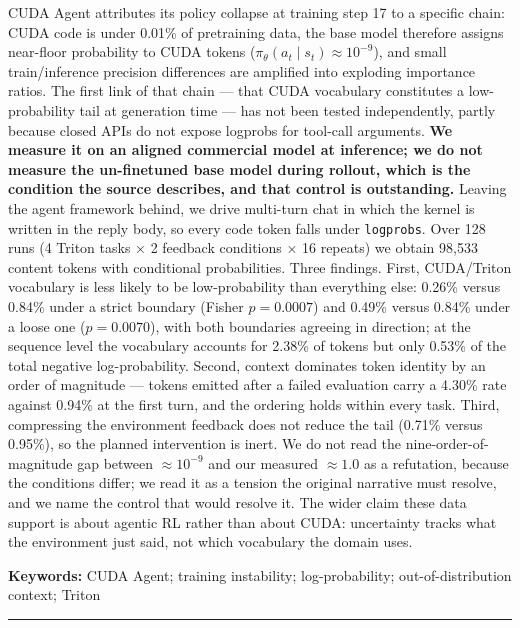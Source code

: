 \documentclass[
  11pt,
]{article}
\begin{document}
CUDA Agent attributes its policy collapse at training step 17 to a
specific chain: CUDA code is under 0.01\% of pretraining data, the base
model therefore assigns near-floor probability to CUDA tokens
(\(\pi_\theta(a_t \mid s_t) \approx 10^{-9}\)), and small
train/inference precision differences are amplified into exploding
importance ratios. The first link of that chain --- that CUDA vocabulary
constitutes a low-probability tail at generation time --- has not been
tested independently, partly because closed APIs do not expose logprobs
for tool-call arguments. \textbf{We measure it on an aligned commercial
model at inference; we do not measure the un-finetuned base model during
rollout, which is the condition the source describes, and that control
is outstanding.} Leaving the agent framework behind, we drive multi-turn
chat in which the kernel is written in the reply body, so every code
token falls under \texttt{logprobs}. Over 128 runs (4 Triton tasks × 2
feedback conditions × 16 repeats) we obtain 98,533 content tokens with
conditional probabilities. Three findings. First, CUDA/Triton vocabulary
is less likely to be low-probability than everything else: 0.26\% versus
0.84\% under a strict boundary (Fisher \(p = 0.0007\)) and 0.49\% versus
0.84\% under a loose one (\(p = 0.0070\)), with both boundaries agreeing
in direction; at the sequence level the vocabulary accounts for 2.38\%
of tokens but only 0.53\% of the total negative log-probability. Second,
context dominates token identity by an order of magnitude --- tokens
emitted after a failed evaluation carry a 4.30\% rate against 0.94\% at
the first turn, and the ordering holds within every task. Third,
compressing the environment feedback does not reduce the tail (0.71\%
versus 0.95\%), so the planned intervention is inert. We do not read the
nine-order-of-magnitude gap between \(\approx 10^{-9}\) and our measured
\(\approx 1.0\) as a refutation, because the conditions differ; we read
it as a tension the original narrative must resolve, and we name the
control that would resolve it. The wider claim these data support is
about agentic RL rather than about CUDA: uncertainty tracks what the
environment just said, not which vocabulary the domain uses.

\textbf{Keywords:} CUDA Agent; training instability; log-probability;
out-of-distribution context; Triton

\begin{center}\rule{0.5\linewidth}{0.5pt}\end{center}
\end{document}
